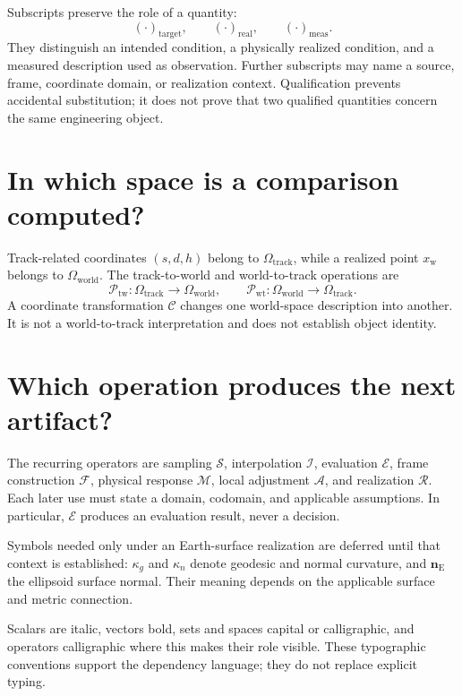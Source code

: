 Subscripts preserve the role of a quantity:
\[
(\cdot)_{\mathrm{target}},\qquad
(\cdot)_{\mathrm{real}},\qquad
(\cdot)_{\mathrm{meas}}.
\]
They distinguish an intended condition, a physically realized
condition, and a measured description used as observation. Further
subscripts may name a source, frame, coordinate domain, or realization
context. Qualification prevents accidental substitution; it does not
prove that two qualified quantities concern the same engineering object.

\section{In which space is a comparison computed?}

Track-related coordinates \((s,d,h)\) belong to
\(\Omega_{\mathrm{track}}\), while a realized point
\(x_{\mathrm w}\) belongs to \(\Omega_{\mathrm{world}}\). The
track-to-world and world-to-track operations are
\[
\mathcal P_{\mathrm{tw}}:
\Omega_{\mathrm{track}}\rightarrow\Omega_{\mathrm{world}},
\qquad
\mathcal P_{\mathrm{wt}}:
\Omega_{\mathrm{world}}\rightarrow\Omega_{\mathrm{track}}.
\]
A coordinate transformation \(\mathcal C\) changes one world-space
description into another. It is not a world-to-track interpretation and
does not establish object identity.

\section{Which operation produces the next artifact?}

The recurring operators are sampling \(\mathcal S\), interpolation
\(\mathcal I\), evaluation \(\mathcal E\), frame construction
\(\mathcal F\), physical response \(\mathcal M\), local adjustment
\(\mathcal A\), and realization \(\mathcal R\). Each later use must
state a domain, codomain, and applicable assumptions. In particular,
\(\mathcal E\) produces an evaluation result, never a decision.

Symbols needed only under an Earth-surface realization are deferred
until that context is established: \(\kappa_g\) and \(\kappa_n\) denote
geodesic and normal curvature, and \(\mathbf n_{\mathrm E}\) the
ellipsoid surface normal. Their meaning depends on the applicable
surface and metric connection.

Scalars are italic, vectors bold, sets and spaces capital or
calligraphic, and operators calligraphic where this makes their role
visible. These typographic conventions support the dependency language;
they do not replace explicit typing.
